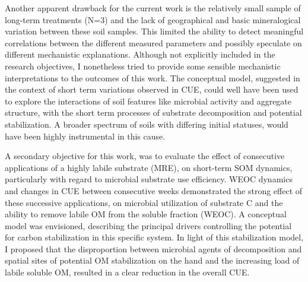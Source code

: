 Another apparent drawback for the current work is the relatively small sample of long-term treatments (N=3) and the lack of geographical and basic mineralogical variation between these soil samples. This limited the ability to detect meaningful correlations between the different measured parameters and possibly speculate on different mechanistic explanations. Although not explicitly included in the research objectives, I nonetheless tried to provide some sensible mechanistic interpretations to the outcomes of this work. The conceptual model, suggested in the context of short term variations observed in CUE, could well have been used to explore the interactions of soil features like microbial activity and aggregate structure, with the short term processes of substrate decomposition and potential stabilization. A broader spectrum of soils with differing initial statuses, would have been highly instrumental in this cause. 

A secondary objective for this work, was to evaluate the effect of consecutive applications of a highly labile substrate (MRE), on short-term SOM dynamics, particularly with regard to microbial substrate use efficiency. WEOC dynamics and changes in CUE between consecutive weeks demonstrated the strong effect of these successive applications, on microbial utilization of substrate C and the ability to remove labile OM from the soluble fraction (WEOC). A conceptual model was envisioned, describing the principal drivers controlling the potential for carbon stabilization in this specific system. In light of this stabilization model, I proposed that the disproportion between microbial agents of decomposition and spatial sites of potential OM stabilization on the hand and the increasing load of labile soluble OM, resulted in a clear reduction in the overall CUE.     	 
